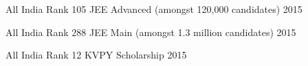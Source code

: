 \begin{cvhonors}

  \cvhonor
  {\ifdefined \ONEPAGE \else All India \fi Rank 105}
  {JEE Advanced (amongst 120,000 candidates)}
  {}
  {2015}

  \cvhonor
  {\ifdefined \ONEPAGE \else All India \fi  Rank 288}
  {JEE Main (amongst 1.3 million candidates)}
  {}
  {2015}

  \cvhonor
  {All India Rank 12}
  {KVPY Scholarship}
  {}
  {2015}

\end{cvhonors}

